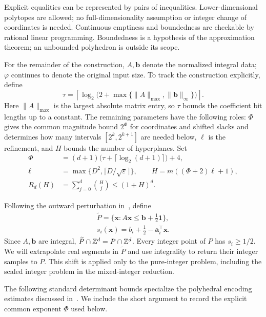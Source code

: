 \documentclass[11pt]{article}
\theoremstyle{definition}\newtheorem{definition}{Definition}[section]
\theoremstyle{remark}\newtheorem{remark}[theorem]{Remark}
\newcommand{\eps}{\varepsilon}
\begin{document}
Explicit equalities can be represented by pairs of inequalities. Lower-dimensional polytopes are allowed; no full-dimensionality assumption or integer change of coordinates is needed. Continuous emptiness and boundedness are checkable by rational linear programming. Boundedness is a hypothesis of the approximation theorem; an unbounded polyhedron is outside its scope.

For the remainder of the construction, $A,\mathbf b$ denote the normalized integral data; $\varphi$ continues to denote the original input size. To track the construction explicitly, define
\begin{equation}\label{eq:tau}
 \tau=\left\lceil\log_2\bigl(2+\max\{\|A\|_{\max},\|\mathbf b\|_\infty\}\bigr)\right\rceil.
\end{equation}
Here $\|A\|_{\max}$ is the largest absolute matrix entry, so $\tau$ bounds the coefficient bit lengths up to a constant. The remaining parameters have the following roles: $\Phi$ gives the common magnitude bound $2^\Phi$ for coordinates and shifted slacks and determines how many intervals $[2^k,2^{k+1}]$ are needed below, $\ell$ is the refinement, and $H$ bounds the number of hyperplanes. Set
\begin{align}
 \Phi&=(d+1)\bigl(\tau+\lceil\log_2(d+1)\rceil\bigr)+4,\label{eq:Phi}\\
 \ell&=\max\{D^2,\lceil D/\sqrt\eps\rceil\},\qquad H=m((\Phi+2)\ell+1),\label{eq:HT}\\
 R_d(H)&=\sum_{j=0}^{d}\binom Hj\le(1+H)^d.\label{eq:F}
\end{align}

Following the outward perturbation in~\cite[proof of Theorem~2.1, p.~29]{CHKM}, define
\[
\begin{gathered}
 \widetilde P=\{\mathbf{x}:A\mathbf{x}\le\mathbf b+\tfrac12\mathbf1\},\\
 s_i(\mathbf{x})=b_i+\tfrac12-\mathbf a_i^\top\mathbf{x}.
\end{gathered}
\]
Since $A,\mathbf b$ are integral, $\widetilde P\cap\mathbb Z^d=P\cap\mathbb Z^d$. Every integer point of $P$ has $s_i\ge1/2$. We will extrapolate real segments in $\widetilde P$ and use integrality to return their integer samples to $P$. This shift is applied only to the pure-integer problem, including the scaled integer problem in the mixed-integer reduction.

The following standard determinant bounds specialize the polyhedral encoding estimates discussed in~\cite[Chapter~10]{Schrijver}. We include the short argument to record the explicit common exponent $\Phi$ used below.
\end{document}
